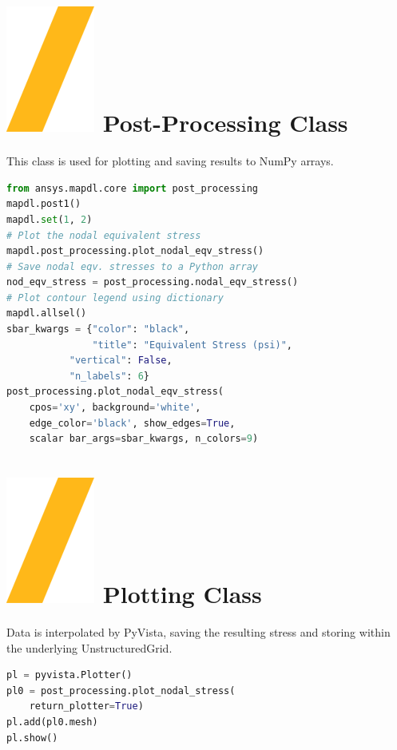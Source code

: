 \documentclass[9pt,landscape]{article}
\begin{document}
\begin{multicols}{3}
\section{\includegraphics[height=\fontcharht\font`\S]{slash.png} Post-Processing Class}
This class is used for plotting and saving results to NumPy arrays.
\begin{lstlisting}[language=Python]
from ansys.mapdl.core import post_processing
mapdl.post1()
mapdl.set(1, 2)
# Plot the nodal equivalent stress
mapdl.post_processing.plot_nodal_eqv_stress()
# Save nodal eqv. stresses to a Python array
nod_eqv_stress = post_processing.nodal_eqv_stress()
# Plot contour legend using dictionary
mapdl.allsel()
sbar_kwargs = {"color": "black",
               "title": "Equivalent Stress (psi)",
	       "vertical": False,
	       "n_labels": 6}
post_processing.plot_nodal_eqv_stress(
    cpos='xy', background='white',
    edge_color='black', show_edges=True,
    scalar bar_args=sbar_kwargs, n_colors=9)
\end{lstlisting} 
\vfill

\section{\includegraphics[height=\fontcharht\font`\S]{slash.png} Plotting Class}
Data is interpolated by PyVista, saving the resulting stress and storing within the underlying UnstructuredGrid.
\begin{lstlisting}[language=Python]
pl = pyvista.Plotter()
pl0 = post_processing.plot_nodal_stress(
    return_plotter=True)
pl.add(pl0.mesh)
pl.show()
\end{lstlisting} 


\end{multicols}
\end{document}
